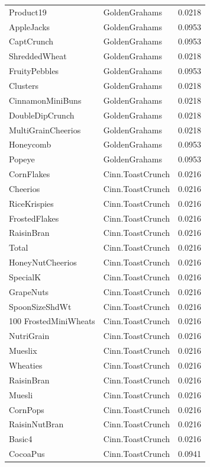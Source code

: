 \begin{longtable}{llr}
Product19 & GoldenGrahams & 0.0218 \\
AppleJacks & GoldenGrahams & 0.0953 \\
CaptCrunch & GoldenGrahams & 0.0953 \\
ShreddedWheat & GoldenGrahams & 0.0218 \\
FruityPebbles & GoldenGrahams & 0.0953 \\
Clusters & GoldenGrahams & 0.0218 \\
CinnamonMiniBuns & GoldenGrahams & 0.0218 \\
DoubleDipCrunch & GoldenGrahams & 0.0218 \\
MultiGrainCheerios & GoldenGrahams & 0.0218 \\
Honeycomb & GoldenGrahams & 0.0953 \\
Popeye & GoldenGrahams & 0.0953 \\
CornFlakes & Cinn.ToastCrunch & 0.0216 \\
Cheerios & Cinn.ToastCrunch & 0.0216 \\
RiceKrispies & Cinn.ToastCrunch & 0.0216 \\
FrostedFlakes & Cinn.ToastCrunch & 0.0216 \\
RaisinBran & Cinn.ToastCrunch & 0.0216 \\
Total & Cinn.ToastCrunch & 0.0216 \\
HoneyNutCheerios & Cinn.ToastCrunch & 0.0216 \\
SpecialK & Cinn.ToastCrunch & 0.0216 \\
GrapeNuts & Cinn.ToastCrunch & 0.0216 \\
SpoonSizeShdWt & Cinn.ToastCrunch & 0.0216 \\
100%
FrostedMiniWheats & Cinn.ToastCrunch & 0.0216 \\
NutriGrain & Cinn.ToastCrunch & 0.0216 \\
Mueslix & Cinn.ToastCrunch & 0.0216 \\
Wheaties & Cinn.ToastCrunch & 0.0216 \\
RaisinBran & Cinn.ToastCrunch & 0.0216 \\
Muesli & Cinn.ToastCrunch & 0.0216 \\
CornPops & Cinn.ToastCrunch & 0.0216 \\
RaisinNutBran & Cinn.ToastCrunch & 0.0216 \\
Basic4 & Cinn.ToastCrunch & 0.0216 \\
CocoaPus & Cinn.ToastCrunch & 0.0941 \\

\end{longtable}

